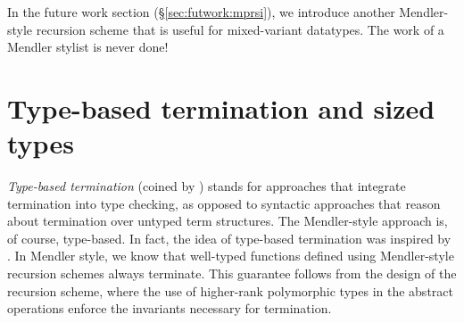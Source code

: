 In the future work section (\S\ref{sec:futwork:mprsi}), we introduce 
another Mendler-style recursion scheme that is useful for
mixed-variant datatypes. The work of a Mendler stylist is never done!



\section[Type-based termination and sized types]{
	 Type-based termination and sized types\footnotemark{} }
\label{sec:relwork:sized}
\emph{Type-based termination} (coined by \citet{BartheFGPU04}) stands for
approaches that integrate termination into type checking, as opposed to
syntactic approaches that reason about termination over untyped term structures.
The Mendler-style approach is, of course, type-based.  In fact, the idea of
type-based termination was inspired by \citet{Mendler87,Mendler91}.
In Mendler style, we know that well-typed functions defined using
Mendler-style recursion schemes always terminate.  This guarantee follows
from the design of the recursion scheme, where the use of higher-rank 
polymorphic types in the abstract operations enforce the invariants
necessary for termination.

